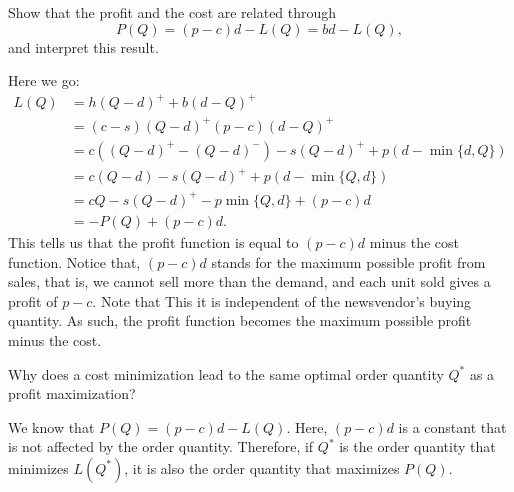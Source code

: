 \begin{exercise}
Show that the profit and the cost are related through
\begin{equation}\label{eq:24}
P(Q) = (p-c)d - L(Q) = b d - L(Q),
\end{equation}
and  interpret this result.
\begin{solution}
    Here we go:
    \begin{align*}
L(Q) 
&= h(Q-d)^+ + b(d-Q)^+ \\
&= (c-s)(Q-d)^+ (p-c)(d-Q)^+ \\
&= c((Q-d)^+ - (Q-d)^-) -s (Q-d)^+ + p(d-\min\{d,Q\}) \\
&= c(Q-d) -s (Q-d)^+ + p(d-\min\{Q,d\}) \\
&= cQ -s (Q-d)^+ - p \min\{Q,d\} + (p-c)d \\
&= -P(Q) + (p-c)d.
    \end{align*}
This tells us that the profit function is equal to $(p-c)d$ minus the cost function. Notice that, $(p-c)d$ stands for the maximum possible profit from sales, that is, we cannot sell more than the demand, and each unit sold gives a profit of $p-c$. Note that This it is independent of the newsvendor's buying quantity. As such, the profit  function becomes the maximum possible profit minus the cost.
  \end{solution}
\end{exercise}



\begin{exercise}
Why does a  cost minimization lead to the same optimal order quantity $Q^*$ as a profit maximization?
\begin{solution}
We know that $P(Q) = (p-c) d - L(Q)$. Here, $(p-c) d$ is a constant that is not affected by the order quantity. Therefore, if $Q^*$ is the order quantity that minimizes $L(Q^*)$, it is also the order quantity that maximizes $P(Q)$. 
\end{solution}
\end{exercise}


